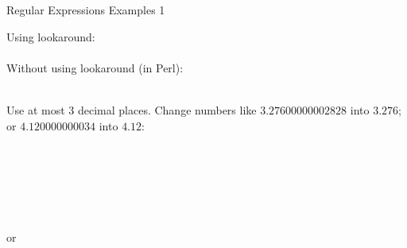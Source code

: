 \documentclass[11pt, a4paper, landscape]{scrartcl}
\newcommand{\regex}[1]{\texttt{#1}}
\begin{document}
\begin{cheatsheet}{Regular Expressions Examples 1}
\begin{col2}
Using lookaround:\\
\regex{}\\

Without using lookaround (in Perl):\\
\regex{}\\


Use at most $3$ decimal places. Change numbers like $3.27600000002828$ into
$3.276$; or $4.120000000034$ into $4.12$:\\
\regex{}\\

\end{col2}

\begin{col3}


\regex{}\\


\regex{}\\


\regex{}\\
or\\
\regex{}\\

\end{col3}

\end{cheatsheet}

\newpage
\end{document}
